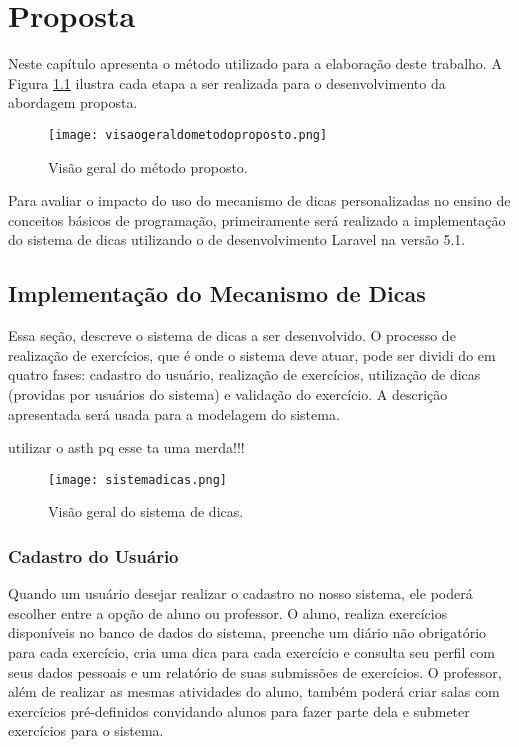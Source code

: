 \chapter{Proposta}

Neste capítulo apresenta o método utilizado para a elaboração deste trabalho. A Figura \ref{figura:visaometodo} ilustra cada etapa a ser realizada para o desenvolvimento da abordagem proposta.

\begin{figure}[h]
	\captionsetup{justification=centering}
	\texttt{[image: visaogeraldometodoproposto.png]}
	\caption{Visão geral do método proposto.}
	\label{figura:visaometodo}
\end{figure}

Para avaliar o impacto do uso do mecanismo de dicas personalizadas no ensino de conceitos básicos de programação, primeiramente será realizado a implementação do sistema de dicas utilizando o  de desenvolvimento Laravel na versão 5.1. 

\section{Implementação do Mecanismo de Dicas}

Essa seção, descreve o sistema de dicas a ser desenvolvido. O processo de realização de exercícios, que é onde o sistema deve atuar, pode ser dividi do em quatro fases: cadastro do usuário, realização de exercícios, utilização de dicas (providas por usuários do sistema) e validação do exercício. A descrição apresentada será usada para a modelagem do sistema.

utilizar o asth pq esse ta uma merda!!!

\begin{figure}[h]
	\captionsetup{justification=centering}
	\texttt{[image: sistemadicas.png]}
	\caption{Visão geral do sistema de dicas.}
	\label{figura:sistemadicas}
\end{figure}

\subsection{Cadastro do Usuário}

Quando um usuário desejar realizar o cadastro no nosso sistema, ele poderá escolher entre a opção de aluno ou professor. O aluno, realiza exercícios disponíveis no banco de dados do sistema, preenche um diário não obrigatório para cada exercício, cria uma dica para cada exercício e consulta seu perfil com seus dados pessoais e um relatório de suas submissões de exercícios. O professor, além de realizar as mesmas atividades do aluno, também poderá criar salas com exercícios pré-definidos convidando alunos para fazer parte dela e submeter exercícios para o sistema.

